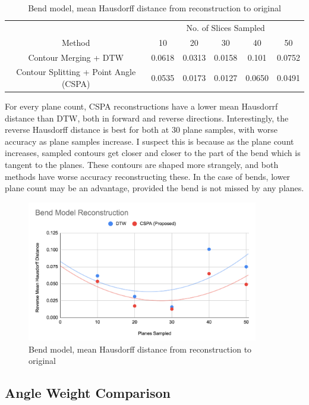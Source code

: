 \documentclass[11p, titlepage]{article}
\begin{document}
\begin{table}[h!]
\begin{tabular}{ | c | c | c | c | c | c | }
\hline
& \multicolumn{5}{c|}{No. of Slices Sampled} \\
\cline{2-6}
Method & 10 & 20 & 30 & 40 & 50 \\
\hline
Contour Merging + DTW & 0.0618 & 0.0313 & 0.0158 & 0.101 & 0.0752 \\
Contour Splitting + Point Angle (CSPA) & 0.0535 & 0.0173 & 0.0127 & 0.0650 & 0.0491 \\
\hline
\end{tabular}
\caption{Bend model, mean Hausdorff distance from reconstruction to original}
\label{table:bend_reverse}
\end{table}

For every plane count, CSPA reconstructions have a lower mean Hausdorrf distance than DTW, both in forward and reverse directions. Interestingly, the reverse Hausdorff distance is best for both at 30 plane samples, with worse accuracy as plane samples increase. I suspect this is because as the plane count increases, sampled contours get closer and closer to the part of the bend which is tangent to the planes. These contours are shaped more strangely, and both methods have worse accuracy reconstructing these. In the case of bends, lower plane count may be an advantage, provided the bend is not missed by any planes.

\begin{figure}[h!]
\centering
\includegraphics[width=0.9\textwidth]{graphs/bend-reverse}
\caption{Bend model, mean Hausdorff distance from reconstruction to original\label{fig:bend_reverse_graph}}
\end{figure}

\subsection{Angle Weight Comparison}
\end{document}
